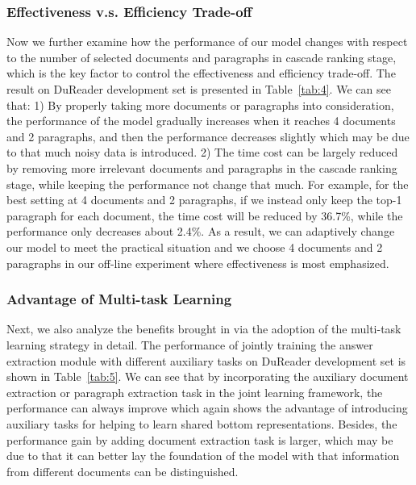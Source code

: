 \documentclass[letterpaper]{article} \usepackage{aaai19}  \usepackage{graphicx}
\begin{document}
\subsubsection{Effectiveness v.s. Efficiency Trade-off}
Now we further examine how the performance of our model changes with respect to the number of selected documents and paragraphs in cascade ranking stage, which is the key factor to control the effectiveness and efficiency trade-off. The result on DuReader development set is presented in Table~\ref{tab:4}. We can see that: 1) By properly taking more documents or paragraphs into consideration, the performance of the model gradually increases when it reaches 4 documents and 2 paragraphs, and then the performance decreases slightly which may be due to that much noisy data is introduced.  2) The time cost can be largely reduced by removing more irrelevant documents and paragraphs in the cascade ranking stage, while keeping the performance not change that much. For example, for the best setting at 4 documents and 2 paragraphs, if we instead only keep the top-1 paragraph for each document, the time cost will be reduced by 36.7\%, while the performance only decreases about 2.4\%. As a result, we can adaptively change our model to meet the practical situation and we choose 4 documents and 2 paragraphs in our off-line experiment where effectiveness is most emphasized.



\subsubsection{Advantage of Multi-task Learning}
Next, we also analyze the benefits brought in via the adoption of the multi-task learning strategy in detail. The performance of jointly training the answer extraction module with different auxiliary tasks on DuReader development set is shown in Table~\ref{tab:5}. We can see that by incorporating the auxiliary document extraction or paragraph extraction task in the joint learning framework, the performance can always improve which again shows the advantage of introducing auxiliary tasks for helping to learn shared bottom representations. Besides, the performance gain by adding document extraction task is larger, which may be due to that it can better lay the foundation of the model with that information from different documents can be distinguished. 
\end{document}
